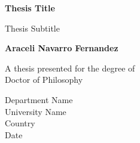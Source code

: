 \begin{titlepage}
    \begin{center}
        
        \vspace*{1cm}
        \Huge
        \textbf{Thesis Title}
        
        \vspace{0.5cm}
        \LARGE
        Thesis Subtitle

        \vspace{1.5cm}

        \textbf{Araceli Navarro Fernandez}

        \vfill

        A thesis presented for the degree of \\
        Doctor of Philosophy

        \vspace{0.8cm}
        \large
        Department Name \\
        University Name \\
        Country \\
        Date


    \end{center}
\end{titlepage}